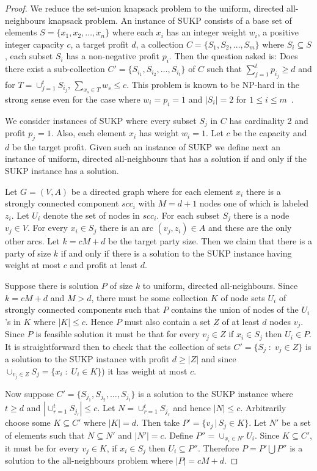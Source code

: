 \documentclass[12pt]{article}
\begin{document}
\begin{proof}
We reduce the set-union knapsack problem to the uniform, directed
all-neighbours knapsack problem.  An instance of SUKP consists of a
base set of elements $S=\{x_1, x_2,\ldots, x_n\}$ where each $x_i$ has
an integer weight $w_i$, a positive integer capacity $c$, a target
profit $d$, a collection $C=\{S_1,S_2,\ldots, S_m\}$ where
$S_i\subseteq S$, each subset $S_i$ has a non-negative profit $p_i$.
Then the question asked is: Does there exist a sub-collection
$C'=\{S_{i_1}, S_{i_2},\ldots, S_{i_t}\}$ of $C$ such that
$\sum_{j=1}^t p_{i_j} \geq d$ and for $T=\cup_{j=1}^t S_{i_j}$,
$\sum_{x_s\in T} w_s \leq c$.  This problem is known to be NP-hard in
the strong sense even for the case where $w_i=p_i=1$ and $|S_i|=2$ for
$1\le i\le m$~\cite{goldschmidt-etal:nrl1994}.

We consider instances of SUKP where
every subset $S_j$ in $C$ has cardinality 2 and profit $p_j=1$.
Also, each element $x_i$ has weight $w_i=1$.
Let $c$ be the capacity and $d$ be the target profit.
Given such an instance of SUKP we define next an
instance of uniform, directed all-neighbours that has a solution if and only
if the SUKP instance has a solution.

Let $G=(V,A)$ be a directed graph where for each element $x_i$ there
is a strongly connected component $scc_i$ with $M=d+1$ nodes one
of which is labeled $z_i$.
Let $U_i$ denote the set of nodes in $scc_i$.
For each subset $S_j$ there is a node $v_j\in V$.
For every $x_i\in S_j$ there is an arc $(v_j,z_i)\in A$ and
these are the only other arcs.
Let $k=cM+d$ be the target party size.
Then we claim that there is a party of size $k$ if and only
if there is a solution to the SUKP instance
having weight at most $c$ and profit at least $d$.

Suppose there is solution $P$ of size $k$ to uniform, directed all-neighbours.
Since $k=cM+d$ and $M>d$, there must be some collection $K$ of
node sets $U_i$ of strongly connected components such
that $P$ contains the union of nodes of the $U_i$'s
in $K$ where $|K|\le c$.
Hence $P$ must also contain a set $Z$ of at least $d$ nodes $v_j$.
Since $P$ is feasible solution it must be that for every $v_j\in Z$
if $x_i\in S_j$ then $U_i \in P$.
It is straightforward then to check that the collection of sets
$C'=\{S_j\; : \; v_j \in Z \}$
is a solution to the SUKP instance
with profit $d\ge |Z|$ and
since $\cup_{v_j\in Z} S_j = \{ x_i \; : \; U_i\in K\}$)
it has weight at most $c$.

Now suppose $C'=\{S_{j_1},S_{j_2},\ldots, S_{j_t}\}$ is a solution
to the SUKP instance where $t\geq d$ and
$|\cup_{r=1}^t S_{j_r}| \le c$.
Let $N=\cup_{r=1}^t S_{j_r}$ and hence $|N|\leq c$.
Arbitrarily choose some $K\subseteq C'$ where $|K|=d$.
Then take $P'=\{v_j \,|\, S_j\in K\}$.
Let $N'$ be a set of elements such that $N\subseteq N'$ and $|N'|=c$.
Define $P''=\cup_{x_i \in N'} U_i$.
Since $K\subseteq C'$, it must be for every $v_j\in K$, if
$x_i\in S_j$ then $U_i \subseteq P''$.
Therefore $P=P'\bigcup P''$ is a solution to the all-neighbours
problem where $|P|=cM+d$.
\end{proof}
\end{document}
